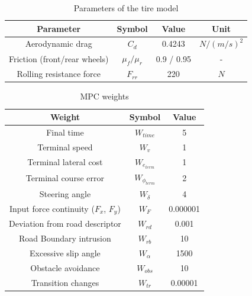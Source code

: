 \documentclass[a4paper, onecolumn, 11pt]{article}
\begin{document}
\begin{table}[H]
    \centering
    \caption{Parameters of the tire model} \label{env_params}
    \begin{tabular}{ |c|c|c|c| }
        \hline
        \textbf{Parameter} & \textbf{Symbol} & \textbf{Value} & \textbf{Unit} \\ [0.5ex] 
        \hline
        \hline 
        Aerodynamic drag & $C_d$ & 0.4243 & $N/(m/s)^2$ \\
        \hline
        Friction (front/rear wheels) & $\mu_f/\mu_r$ & 0.9 / 0.95 & - \\
        \hline
        Rolling resistance force & $F_{rr}$ & 220 & $N$ \\
        \hline

    \end{tabular}
\end{table}


\begin{table}[H] 
    \centering
    \caption{MPC weights} \label{weights}
    \begin{tabular}{ |c|c|c| }
        \hline
        \textbf{Weight} & \textbf{Symbol} & \textbf{Value} \\ [0.5ex] 
        \hline
        \hline
        Final time & $W_{time}$ & 5\\ 
        \hline
        Terminal speed & $W_{v}$ & 1\\
        \hline
        Terminal lateral cost & $W_{e_{term}}$ & 1 \\
        \hline
        Terminal course error & $W_{\phi_{term}}$ & 2 \\
        \hline
        Steering angle & $W_{\dot{\delta}}$ & 4 \\
        \hline 
        Input force continuity ($F_x$, $F_y$) & $W_{F}$ & 0.000001 \\
        \hline
        Deviation from road descriptor & $W_{rd}$ & 0.001 \\
        \hline
        Road Boundary intrusion & $W_{rb}$ & 10 \\
        \hline
        Excessive slip angle & $W_\alpha$ & 1500 \\
        \hline
        Obstacle avoidance & $W_{obs}$ & 10 \\
        \hline
        Transition changes & $W_{tr}$ & 0.00001 \\
        \hline
    \end{tabular}
\end{table}
\end{document}
